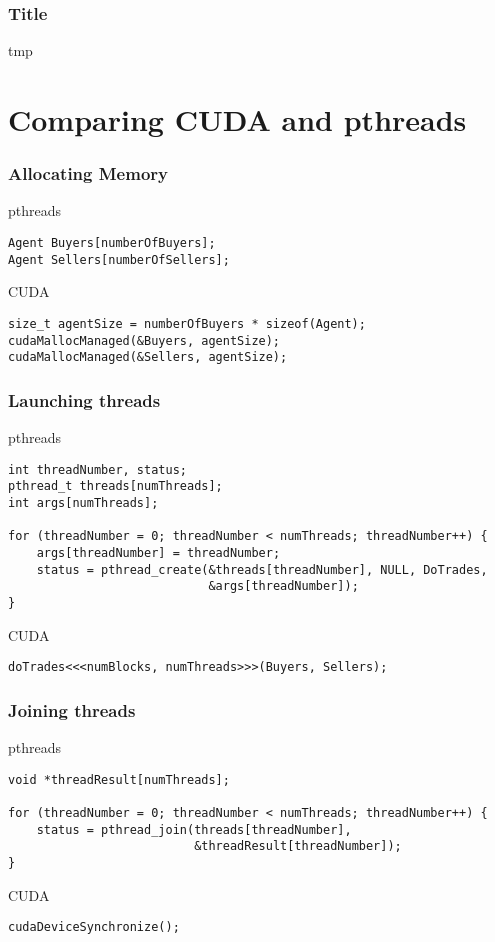 \documentclass{beamer}
\begin{document}
\begin{frame}
  \frametitle{Title}
  tmp
\end{frame}

\section{Comparing CUDA and pthreads}
\begin{frame}[fragile]
  \frametitle{Allocating Memory}
  pthreads
\begin{lstlisting}[frame=single]
Agent Buyers[numberOfBuyers];
Agent Sellers[numberOfSellers];
\end{lstlisting}

  CUDA
\begin{lstlisting}[frame=single]
size_t agentSize = numberOfBuyers * sizeof(Agent);
cudaMallocManaged(&Buyers, agentSize);
cudaMallocManaged(&Sellers, agentSize);
\end{lstlisting}
\end{frame}

\begin{frame}[fragile]
  \frametitle{Launching threads}
  pthreads
\begin{lstlisting}[frame=single]
int threadNumber, status;
pthread_t threads[numThreads];
int args[numThreads];

for (threadNumber = 0; threadNumber < numThreads; threadNumber++) {
    args[threadNumber] = threadNumber;
    status = pthread_create(&threads[threadNumber], NULL, DoTrades,
                            &args[threadNumber]);
}
\end{lstlisting}

  CUDA
\begin{lstlisting}[frame=single]
doTrades<<<numBlocks, numThreads>>>(Buyers, Sellers);
\end{lstlisting}
\end{frame}

\begin{frame}[fragile]
  \frametitle{Joining threads}
  pthreads
\begin{lstlisting}[frame=single]
void *threadResult[numThreads];

for (threadNumber = 0; threadNumber < numThreads; threadNumber++) {
    status = pthread_join(threads[threadNumber],
                          &threadResult[threadNumber]);
}
\end{lstlisting}

  CUDA
\begin{lstlisting}[frame=single]
cudaDeviceSynchronize();
\end{lstlisting}
\end{frame}
\end{document}

